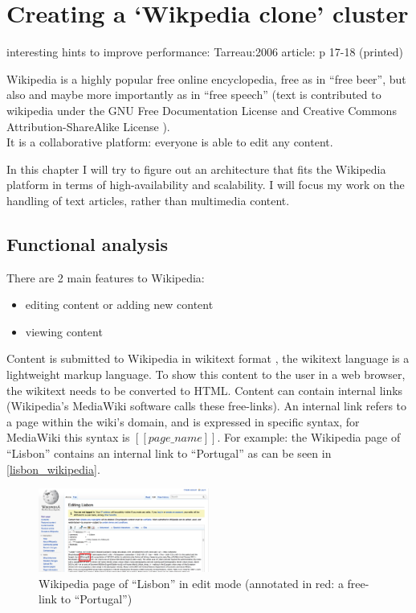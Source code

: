 \documentclass[12pt]{report}
\begin{document}
\chapter{Creating a `Wikpedia clone' cluster}
interesting hints to improve performance: Tarreau:2006 article: p
17-18 (printed)

Wikipedia is a highly popular free online encyclopedia, free 
as in ``free beer'', but also and maybe more importantly as in ``free
speech'' (text is contributed to wikipedia under the GNU Free
Documentation License \cite{gnu_free_doc_license} and Creative Commons
Attribution-ShareAlike License \cite{cca_license}).\\ It is a
collaborative platform: everyone is able to edit any content.

In this chapter I will try to figure out an architecture that fits the
Wikipedia platform in terms of high-availability and scalability.
I will focus my work on the handling of text articles, rather than
multimedia content.

\section{Functional analysis}
There are 2 main features to Wikipedia:
\begin{itemize}
\item editing content or adding new content
\item viewing content
\end{itemize}
Content is submitted to Wikipedia in wikitext
format \cite{wikitext}, the wikitext language is a lightweight markup
language. To show this content to the user in a web browser, 
the wikitext needs to be converted to HTML.
Content can contain internal links (Wikipedia's MediaWiki software
calls these free-links). An internal link refers to a page within
the wiki's domain, and is expressed in specific syntax, for MediaWiki
this syntax is $[[page\_name]]$. For example: the Wikipedia page of ``Lisbon''
contains an internal link to ``Portugal'' as can be seen in
\ref{lisbon_wikipedia}.

\begin{figure}[h!]
  \caption{Wikipedia page of ``Lisbon'' in edit mode (annotated in
    red: a free-link to ``Portugal'')}
  \label{fig:lisbon_wikipedia}
  \centering
    \includegraphics[width=0.5\textwidth]{pics/wikipedia_lisbon.png}
\end{figure}
\end{document}
